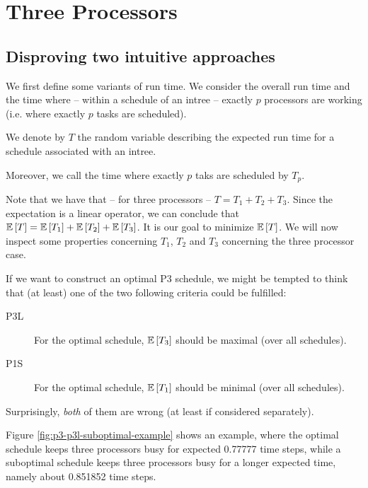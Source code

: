 \chapter{Three Processors}
\label{chap:p3}



\section{Disproving two intuitive approaches}
\label{sec:p3-disproving-long-p3-and-short-p1-time}

We first define some variants of run time. We consider the overall run time and the time where -- within a schedule of an intree -- exactly $p$ processors are working (i.e. where exactly $p$ tasks are scheduled).

\begin{definition}
  We denote by $T$ the random variable describing the expected run time for a schedule associated with an intree. 

  Moreover, we call the time where exactly $p$ taks are scheduled by $T_p$.
\end{definition}

Note that we have that -- for three processors -- $T=T_1 + T_2 + T_3$. Since the expectation is a linear operator, we can conclude that $\mathbb{E}\left[ T \right]=\mathbb{E}\left[ T_1 \right]+\mathbb{E}\left[ T_2 \right]+\mathbb{E}\left[ T_3 \right]$. It is our goal to minimize $\mathbb{E}\left[ T \right]$. We will now inspect some properties concerning $T_1$, $T_2$ and $T_3$ concerning the three processor case.

If we want to construct an optimal P3 schedule, we might be tempted to think that (at least) one of the two following criteria could be fulfilled:

\begin{description}
\item[P3L] For the optimal schedule, $\mathbb{E}\left[ T_3 \right]$ should be maximal (over all schedules).
\item[P1S] For the optimal schedule, $\mathbb{E}\left[ T_1 \right]$ should be minimal (over all schedules).
\end{description}

Surprisingly, \emph{both} of them are wrong (at least if considered separately).

Figure \ref{fig:p3-p3l-suboptimal-example} shows an example, where the optimal schedule keeps three processors busy for expected 0.77777 time steps, while a suboptimal schedule keeps three processors busy for a longer expected time, namely about 0.851852 time steps.

